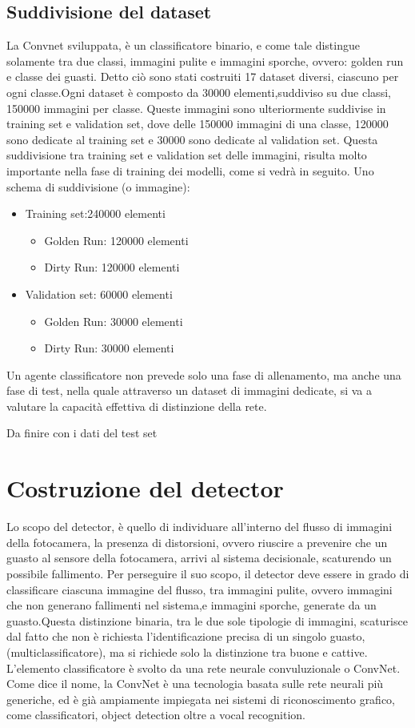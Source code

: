 \documentclass[14pt]{extarticle}
\begin{document}
\subsection{Suddivisione del dataset}
La Convnet sviluppata, è un classificatore binario, e come tale distingue solamente tra due classi, immagini pulite e immagini sporche, ovvero: golden run e classe dei guasti.
Detto ciò sono stati costruiti 17 dataset diversi, ciascuno per ogni classe.Ogni dataset è composto da 30000 elementi,suddiviso su due classi, 150000 immagini per classe. Queste immagini sono ulteriormente suddivise in training set e validation set, dove delle 150000 immagini di una classe, 120000 sono dedicate al training set e 30000 sono dedicate al validation set.
Questa suddivisione tra training set e validation set delle immagini, risulta molto importante nella fase di training dei modelli, come si vedrà in seguito.
Uno schema di suddivisione (o immagine):
\begin{itemize}
\item Training set:240000 elementi
\begin{itemize}
\item Golden Run: 120000 elementi
\item Dirty Run: 120000 elementi
\end{itemize}
\item Validation set: 60000 elementi
\begin{itemize}
\item Golden Run: 30000 elementi
\item Dirty Run: 30000 elementi
\end{itemize}
\end{itemize}
Un agente classificatore non prevede solo una fase di allenamento, ma anche una fase di test, nella quale attraverso un dataset di immagini dedicate, si va a valutare la capacità effettiva di distinzione della rete.

Da finire con i dati del test set
\section{Costruzione del detector}
Lo scopo del detector, è quello di individuare all'interno del flusso di immagini della fotocamera, la presenza di distorsioni, ovvero riuscire a prevenire che un guasto al sensore della fotocamera, arrivi al sistema decisionale, scaturendo un possibile fallimento. Per perseguire il suo scopo, il detector deve essere in grado di classificare ciascuna immagine del flusso, tra immagini pulite, ovvero immagini che non generano fallimenti nel sistema,e immagini sporche, generate da un guasto.Questa distinzione binaria, tra le due sole tipologie di immagini, scaturisce dal fatto che non è richiesta l'identificazione precisa di un singolo guasto,(multiclassificatore), ma si richiede solo la distinzione tra buone e cattive.
L'elemento classificatore è svolto da una rete neurale convuluzionale o ConvNet.
Come dice il nome, la  ConvNet è  una tecnologia basata sulle rete neurali più generiche, ed è già ampiamente impiegata nei sistemi di riconoscimento grafico, come classificatori, object detection oltre a vocal recognition.
\end{document}
